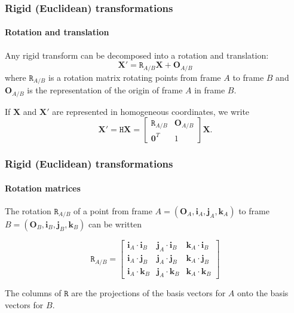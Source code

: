 \documentclass[aspectratio=169]{beamer}
\renewcommand{\vec}[1]{\boldsymbol{#1}}
\newcommand{\mat}[1]{\mathtt{#1}}
\begin{document}
\begin{frame}
\frametitle{Rigid (Euclidean) transformations}
\framesubtitle{Rotation and translation}

Any rigid transform can be decomposed into a rotation and translation:
\begin{equation*}
\vec{X}' = \mat{R}_{A/B} \vec{X} + \vec{O}_{A/B}
\end{equation*}
where $\mat{R}_{A/B}$ is a \alert{rotation matrix} rotating points
from frame $A$ to frame $B$ and $\vec{O}_{A/B}$ is the representation
of the origin of frame $A$ in frame $B$.

\medskip

If $\vec{X}$ and $\vec{X}'$ are represented in homogeneous
coordinates, we write
\begin{equation*}
\vec{X}' = \mat{H} \vec{X} =
 \begin{bmatrix} \mat{R}_{A/B} & \vec{O}_{A/B} \\ \vec{0}^T & 1
 \end{bmatrix}
  \vec{X}.
\end{equation*}

\end{frame}

\begin{frame}
\frametitle{Rigid (Euclidean) transformations}
\framesubtitle{Rotation matrices}

The rotation $\mat{R}_{A/B}$ of a point from frame $A =
(\vec{O}_A,\vec{i}_A,\vec{j}_A,\vec{k}_A)$ to frame $B =
(\vec{O}_B,\vec{i}_B,\vec{j}_B,\vec{k}_B)$ can be written

\begin{equation}
\mat{R}_{A/B} = \begin{bmatrix}
\vec{i}_A \cdot \vec{i}_B &
\vec{j}_A \cdot \vec{i}_B &
\vec{k}_A \cdot \vec{i}_B \\
\vec{i}_A \cdot \vec{j}_B &
\vec{j}_A \cdot \vec{j}_B &
\vec{k}_A \cdot \vec{j}_B \\
\vec{i}_A \cdot \vec{k}_B &
\vec{j}_A \cdot \vec{k}_B &
\vec{k}_A \cdot \vec{k}_B
\end{bmatrix}
\end{equation}

The \alert{columns} of $\mat{R}$ are the projections of the basis
vectors for $A$ onto the basis vectors for $B$.

\end{frame}
\end{document}
